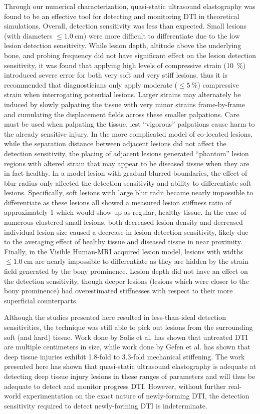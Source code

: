 		Through our numerical characterization, quasi-static ultrasound elastography was found to be an effective tool for detecting and monitoring DTI in theoretical simulations. Overall, detection sensitivity was less than expected. Small lesions (with diameters $\leq \SI{1.0}{\cm}$) were more difficult to differentiate due to the low lesion detection sensitivity. While lesion depth, altitude above the underlying bone, and probing frequency did not have significant effect on the lesion detection sensitivity, it was found that applying high levels of compressive strain (\SI{10}{\percent}) introduced severe error for both very soft and very stiff lesions, thus it is recommended that diagnosticians only apply moderate ($\leq \SI{5}{\percent}$) compressive strain when interrogating potential lesions. Larger strains may alternately be induced by slowly palpating the tissue with very minor strains frame-by-frame and cumulating the displacement fields across these smaller palpations. Care must be used when palpating the tissue, lest ``vigorous'' palpations cause harm to the already sensitive injury. In the more complicated model of co-located lesions, while the separation distance between adjacent lesions did not affect the detection sensitivity, the placing of adjacent lesions generated ``phantom'' lesion regions with altered strain that may appear to be diseased tissue when they are in fact healthy. In a model lesion with gradual blurred boundaries, the effect of blur radius only affected the detection sensitivity and ability to differentiate soft lesions. Specifically, soft lesions with large blur radii became nearly impossible to differentiate as these lesions all showed a measured lesion stiffness ratio of approximately 1 which would show up as regular, healthy tissue. In the case of numerous clustered small lesions, both decreased lesion density and decreased individual lesion size caused a decrease in lesion detection sensitivity, likely due to the averaging effect of healthy tissue and diseased tissue in near proximity. Finally, in the Visible Human-MRI acquired lesion model, lesions with widths $\leq \SI{1.0}{\cm}$ are nearly impossible to differentiate as they are hidden by the strain field generated by the bony prominence. Lesion depth did not have an effect on the detection sensitivity, though deeper lesions (lesions which were closer to the bony prominence) had overestimated stiffnesses with respect to their more superficial counterparts.

		Although the studies presented here resulted in less-than-ideal detection sensitivities, the technique was still able to pick out lesions from the surrounding soft (and hard) tissue. Work done by Solis et al. \cite{solis13} has shown that untreated DTI are multiple centimeters in size, while work done by Gefen et al. \cite{gefen05} has shown that deep tissue injuries exhibit 1.8-fold to 3.3-fold mechanical stiffening. The work presented here has shown that quasi-static ultrasound elastography is adequate at detecting deep tissue injury lesions in these ranges of parameters and will thus be adequate to detect and monitor progress DTI. However, without further real-world experimentation on the exact nature of newly-forming DTI, the detection sensitivity required to detect newly-forming DTI is indeterminate.

